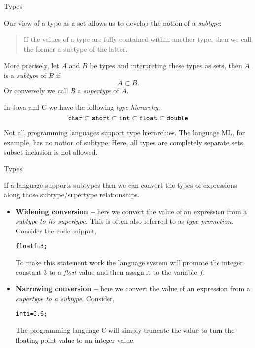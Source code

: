 \documentclass{beamer}
\begin{document}
\begin{frame}[fragile]{Types}

\small
Our view of a type as a set allows us to develop the notion of a {\em subtype}:

\begin{quote}
If the values of a type are fully contained within another type, then we call the former a subtype of the latter.
\end{quote}
More precisely, let $A$ and $B$ be types and interpreting these types as sets, then $A$ is a {\em subtype} of $B$ if
\[
A \subset B.
\]
Or conversely we call $B$ a {\em supertype} of $A$.

\vspace{.1in}
In Java and C we have the following {\em type hierarchy}:
{\scriptsize
\[
{\tt char} \subset {\tt short} \subset {\tt int} \subset {\tt float} \subset {\tt double}
\]
}

Not all programming languages support type hierarchies.  The language ML, for example, has no notion of subtype.
Here, all types are completely separate sets, subset inclusion is not allowed.
\end{frame}


\begin{frame}[fragile]{Types}

\small
If a language supports subtypes then we can convert the types of expressions along those subtype/supertype
relationships.
\begin{itemize}
\item{\bf Widening conversion --} here we convert the value of an expression from a {\em subtype to its supertype}.
This is often also referred to as {\em type promotion}.  Consider the code snippet,
{\scriptsize
\begin{alltt}
float f = 3;
\end{alltt}
}
To make this statement work the language system will promote the integer constant 3 to a {\em float}
value and then assign it to the variable $f$.

\item{\bf Narrowing conversion --} here we convert the value of an expression from a {\em supertype to a subtype}.
Consider,
{\scriptsize
\begin{alltt}
int i = 3.6;
\end{alltt}
}
The programming language C will simply truncate the value to turn the floating point value to an integer value.
\end{itemize}

\end{frame}
\end{document}
